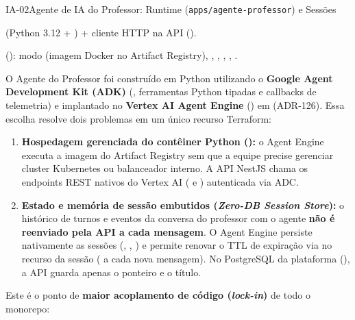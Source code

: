 \begin{pecaarq}{IA-02}{Agente de IA do Professor: Runtime (\texttt{apps/agente-professor}) e Sessões}{\sgcp~\nativo\enspace\saws~\adaptacao\enspace\sazure~\adaptacao}
\begin{campos}
  \item[Código e stack]  (Python 3.12 + ) + cliente HTTP na API ().
  \item[Configuração GCP]  (): modo  (imagem Docker no Artifact Registry), , , , , .
  \item[Como é hoje (GCP)] O Agente do Professor foi construído em Python utilizando o \textbf{Google Agent Development Kit (ADK)} (, ferramentas Python tipadas e callbacks de telemetria) e implantado no \textbf{Vertex AI Agent Engine} () em  (ADR-126). Essa escolha resolve dois problemas em um único recurso Terraform:
  \begin{enumerate}
    \item \textbf{Hospedagem gerenciada do contêiner Python ():} o Agent Engine executa a imagem do Artifact Registry sem que a equipe precise gerenciar cluster Kubernetes ou balanceador interno. A API NestJS chama os endpoints REST nativos do Vertex AI ( e ) autenticada via ADC.
    \item \textbf{Estado e memória de sessão embutidos (\emph{Zero-DB Session Store}):} o histórico de turnos e eventos da conversa do professor com o agente \textbf{não é reenviado pela API a cada mensagem}. O Agent Engine persiste nativamente as sessões (, , ) e permite renovar o TTL de expiração via  no recurso da sessão ( a cada nova mensagem). No PostgreSQL da plataforma (), a API guarda apenas o ponteiro  e o título.
  \end{enumerate}
  \item[Equivalente AWS] Este é o ponto de \textbf{maior acoplamento de código (\emph{lock-in})} de todo o monorepo:
  \begin{itemize}

\end{itemize}
\end{campos}
\end{pecaarq}
